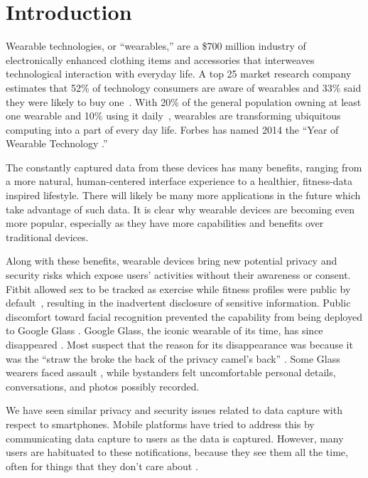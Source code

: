 
\section{Introduction}

Wearable technologies, or ``wearables,'' are a \$700 million industry \cite{cmo} of electronically enhanced clothing items and accessories that interweaves technological interaction with everyday life. A top 25 market research company estimates that 52\% of technology consumers are aware of wearables and 33\% said they were likely to buy one~\cite{NPD}. With 20\% of the general population owning at least one wearable and 10\% using it daily~\cite{WearableStatNews}, wearables are transforming ubiquitous computing into a part of every day life. Forbes has named 2014 the ``Year of Wearable Technology \cite{Forbes}.''

The constantly captured data from these devices has many benefits, ranging from a more natural, human-centered interface experience to a healthier, fitness-data inspired lifestyle. There will likely be many more applications in the future which take advantage of such data. It is clear why wearable devices are becoming even more popular, especially as they have more capabilities and benefits over traditional devices. 

Along with these benefits, wearable devices bring new potential privacy and security risks which expose users' activities without their awareness or consent. Fitbit allowed sex to be tracked as exercise while fitness profiles were public by default~\cite{Fitbit}, resulting in the inadvertent disclosure of sensitive information. Public discomfort toward facial recognition prevented the capability from being deployed to Google Glass \cite{GlassDetection}. Google Glass, the iconic wearable of its time, has since disappeared \cite{13_google_2015}. Most suspect that the reason for its disappearance was because it was the ``straw the broke the back of the privacy camel's back'' \cite{14_dvorak_2014}. Some Glass wearers faced assault \cite{1_russell_2014, 15_mashable_2014, 16_gross_2014}, while bystanders felt uncomfortable personal details, conversations, and photos possibly recorded.

We have seen similar privacy \cite{kelley2013privacy, sadeh2009understanding, shklovski2014leakiness} and security issues \cite{enck2011study, felt2011survey} related to data capture with respect to smartphones. Mobile platforms have tried to address this by communicating data capture to users as the data is captured. However, many users are habituated to these notifications, because they see them all the time, often for things that they don't care about \cite{felt2012android}.


